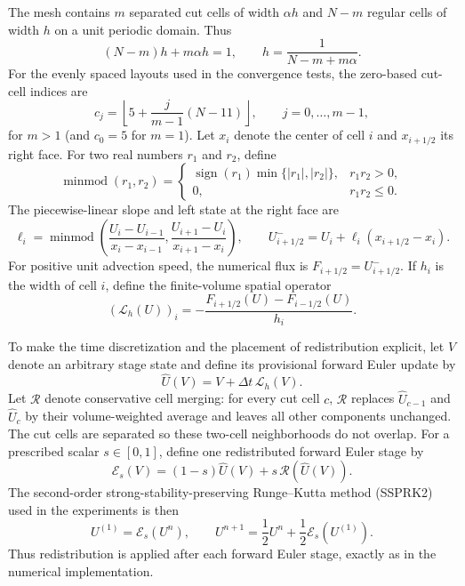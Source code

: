 \documentclass[preprint,12pt]{elsarticle}
\begin{document}
The mesh contains $m$ separated cut cells of width $\alpha h$ and $N-m$
regular cells of width $h$ on a unit periodic domain.  Thus
\[
    (N-m)h+m\alpha h=1,
    \qquad
    h=\frac{1}{N-m+m\alpha}.
\]
For the evenly spaced layouts used in the convergence tests, the zero-based
cut-cell indices are
\[
    c_j=\left\lfloor 5+\frac{j}{m-1}(N-11)\right\rfloor,
    \qquad j=0,\ldots,m-1,
\]
for $m>1$ (and $c_0=5$ for $m=1$).  Let $x_i$ denote the center of cell $i$
and $x_{i+1/2}$ its right face.  For two real numbers $r_1$ and $r_2$, define
\[
 \operatorname{minmod}(r_1,r_2)
 =
 \begin{cases}
   \operatorname{sign}(r_1)\min\{|r_1|,|r_2|\}, & r_1r_2>0,\\
   0, & r_1r_2\le0.
 \end{cases}
\]
The piecewise-linear slope and left state at the right face are
\[
 \ell_i=\operatorname{minmod}\!\left(
 \frac{U_i-U_{i-1}}{x_i-x_{i-1}},
 \frac{U_{i+1}-U_i}{x_{i+1}-x_i}
 \right),
 \qquad
 U^-_{i+1/2}=U_i+\ell_i(x_{i+1/2}-x_i).
\]
For positive unit advection speed, the numerical flux is
$F_{i+1/2}=U^-_{i+1/2}$.  If $h_i$ is the width of cell $i$, define the
finite-volume spatial operator
\[
 (\mathcal L_h(U))_i
 =
 -\frac{F_{i+1/2}(U)-F_{i-1/2}(U)}{h_i}.
\]

To make the time discretization and the placement of redistribution explicit,
let $V$ denote an arbitrary stage state and define its provisional forward
Euler update by
\[
    \widehat U(V)=V+\Delta t\,\mathcal L_h(V).
\]
Let $\mathcal R$ denote conservative cell merging: for every cut
cell $c$, $\mathcal R$ replaces $\widehat U_{c-1}$ and $\widehat U_c$ by
their volume-weighted average and leaves all other components unchanged.
The cut cells are separated so these two-cell neighborhoods do not overlap.
For a prescribed scalar $s\in[0,1]$, define one redistributed forward Euler
stage by
\begin{equation}
    \mathcal E_s(V)
    =
    (1-s)\widehat U(V)+s\,\mathcal R(\widehat U(V)).
    \label{eq:Es-benchmark}
\end{equation}
The second-order strong-stability-preserving Runge--Kutta method (SSPRK2) used
in the experiments is then
\begin{equation}
    U^{(1)}=\mathcal E_s(U^n),
    \qquad
    U^{n+1}=\frac12U^n+\frac12\mathcal E_s(U^{(1)}).
    \label{eq:ssprk2}
\end{equation}
Thus redistribution is applied after each forward Euler stage, exactly as in
the numerical implementation.
\end{document}
